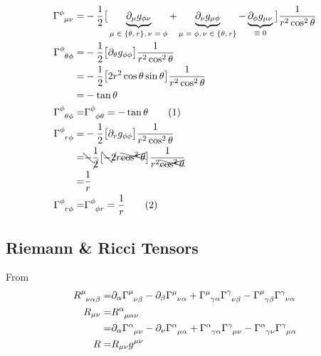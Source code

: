 \documentclass[]{article}
\newcommand\numberthis{\addtocounter{equation}{1}\tag{\theequation}}
\begin{document}
\begin{align*}
	\Gamma\indices{^\phi_{\mu\nu}} =&- \frac{1}{2} \big[\underbrace{ \partial_\mu g_{\phi\nu}}_\text{$\mu\in\{\theta,r\},\nu=\phi$} + \underbrace{\partial_\nu g_{\mu \phi}}_\text{$\mu=\phi,\nu\in\{\theta,r\}$} - \underbrace{\partial_\phi g_{\mu\nu}}_\text{$\equiv0$}\big] \frac{1}{r^2 \cos^2 \theta} \\
	\Gamma\indices{^\phi_{\theta\phi}} =&- \frac{1}{2} \big[ \partial_\theta g_{\phi\phi} \big] \frac{1}{r^2 \cos^2 \theta}\\
	=&- \frac{1}{2} \big[ 2 r^2 \cos \theta \sin \theta \big] \frac{1}{r^2 \cos^2 \theta}\\
	=&-\tan \theta \\
	\Gamma\indices{^\phi_{\theta\phi}} =&\Gamma\indices{^\phi_{\phi\theta}} = -\tan \theta \numberthis \label{eq:Gamma:pHpHtH}\\
	\Gamma\indices{^\phi_{r\phi}} =& - \frac{1}{2} \big[\partial_r g_{\phi\phi}\big] \frac{1}{r^2 \cos^2 \theta}	\\
	=& \bcancel{-} \frac{1}{\cancel{2}} \big[\bcancel{-} \cancel{2} r \xcancel{\cos^2 \theta} \big] \frac{1}{r^2 \xcancel{\cos^2 \theta}}	\\
	=& \frac{1}{r}\\
	\Gamma\indices{^\phi_{r\phi}} =& \Gamma\indices{^\phi_{\phi r}} = \frac{1}{r} \numberthis \label{eq:Gamma:pHrpH}
\end{align*}

\subsection{Riemann \& Ricci Tensors}

From \cite[Lecture II]{akhmedov2016lectures}
\begin{align*}
	R\indices{^\mu_{\nu\alpha\beta}} =& \partial_\alpha \Gamma\indices{^\mu_{\nu\beta}} - \partial_\beta \Gamma\indices{^\mu_{\nu\alpha}} + \Gamma\indices{^\mu_{\gamma\alpha}} \Gamma\indices{^\gamma_{\nu\beta}} - \Gamma\indices{^\mu_{\gamma\beta}} \Gamma\indices{^\gamma_{\nu\alpha}}\\
	R_{\mu\nu} =& R\indices{^\alpha_{\mu\alpha\nu}}\\
	=& \partial_\alpha \Gamma\indices{^\alpha_{\mu\nu}} - \partial_\nu \Gamma\indices{^\alpha_{\mu\alpha}} + \Gamma\indices{^\alpha_{\gamma\alpha}} \Gamma\indices{^\gamma_{\mu\nu}} - \Gamma\indices{^\alpha_{\gamma\nu}} \Gamma\indices{^\gamma_{\mu\alpha}}\\
	R =& R_{\mu\nu} g^{\mu\nu}
\end{align*}
\end{document}

